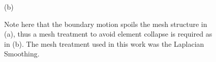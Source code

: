 \begin{figure}[H]
\begin{minipage}{.50\linewidth}
     (b)
     \end{minipage}
     \medskip
     \caption{
Note here that the boundary motion spoils the mesh
structure in (a), thus  a mesh treatment to avoid element
collapse is required as in (b). The mesh treatment
used in this work was the Laplacian Smoothing.
}
     \label{laplacian smoothing fig}
\end{figure}



